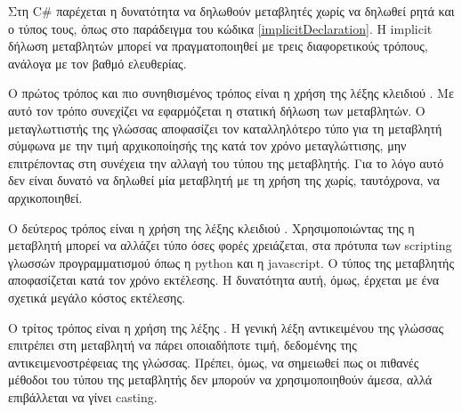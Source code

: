 Στη C\# παρέχεται η δυνατότητα να δηλωθούν μεταβλητές χωρίς να δηλωθεί ρητά και ο τύπος τους, όπως στο παράδειγμα του κώδικα \ref{implicitDeclaration}. Η implicit δήλωση μεταβλητών μπορεί να πραγματοποιηθεί με τρεις διαφορετικούς τρόπους, ανάλογα με τον βαθμό ελευθερίας.

Ο πρώτος τρόπος και πιο συνηθισμένος τρόπος είναι η χρήση της λέξης κλειδιού . Με αυτό τον τρόπο συνεχίζει να εφαρμόζεται η στατική δήλωση των μεταβλητών. Ο μεταγλωττιστής της γλώσσας αποφασίζει τον καταλληλότερο τύπο για τη μεταβλητή σύμφωνα με την τιμή αρχικοποίησής της κατά τον χρόνο μεταγλώττισης, μην επιτρέποντας στη συνέχεια την αλλαγή του τύπου της μεταβλητής. Για το λόγο αυτό δεν είναι δυνατό να δηλωθεί μία μεταβλητή με τη χρήση της  χωρίς, ταυτόχρονα, να αρχικοποιηθεί.

Ο δεύτερος τρόπος είναι η χρήση της λέξης κλειδιού . Χρησιμοποιώντας της η μεταβλητή μπορεί να αλλάζει τύπο όσες φορές χρειάζεται, στα πρότυπα των scripting γλωσσών προγραμματισμού όπως η python και η javascript. Ο τύπος της μεταβλητής αποφασίζεται κατά τον χρόνο εκτέλεσης. Η δυνατότητα αυτή, όμως, έρχεται με ένα σχετικά μεγάλο κόστος εκτέλεσης.

Ο τρίτος τρόπος είναι η χρήση της λέξης . Η γενική λέξη αντικειμένου της γλώσσας επιτρέπει στη μεταβλητή να πάρει οποιαδήποτε τιμή, δεδομένης της αντικειμενοστρέφειας της γλώσσας. Πρέπει, όμως, να σημειωθεί πως οι πιθανές μέθοδοι του τύπου της μεταβλητής δεν μπορούν να χρησιμοποιηθούν άμεσα, αλλά επιβάλλεται να γίνει casting. 

